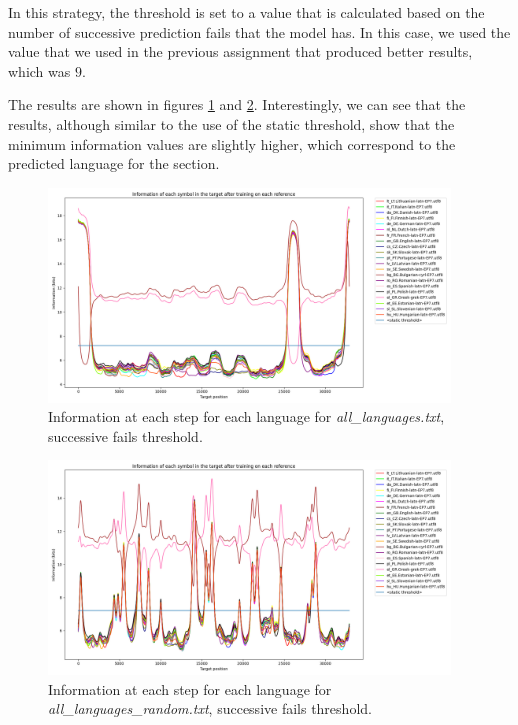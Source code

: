\documentclass{article}
\begin{document}
In this strategy, the threshold is set to a value that is calculated based on the number of successive prediction fails that the model has.
In this case, we used the value that we used in the previous assignment that produced better results, which was $9$.

The results are shown in figures \ref{fig:all_languages_t_f} and \ref{fig:all_languages_random_t_f}.
Interestingly, we can see that the results, although similar to the use of the static threshold,
show that the minimum information values are slightly higher, which correspond to the predicted language for the section.

\begin{figure}
    \centering
    \includegraphics[width=0.95\textwidth]{../results/all_languages/-t_f:9.png}
    \caption{Information at each step for each language for \textit{all\_languages.txt}, successive fails threshold.}
    \label{fig:all_languages_t_f}
\end{figure}

\begin{figure}
    \centering
    \includegraphics[width=0.95\textwidth]{../results/all_languages_random/-t_f:9.png}
    \caption{Information at each step for each language for \textit{all\_languages\_random.txt}, successive fails threshold.}
    \label{fig:all_languages_random_t_f}
\end{figure}
\end{document}
